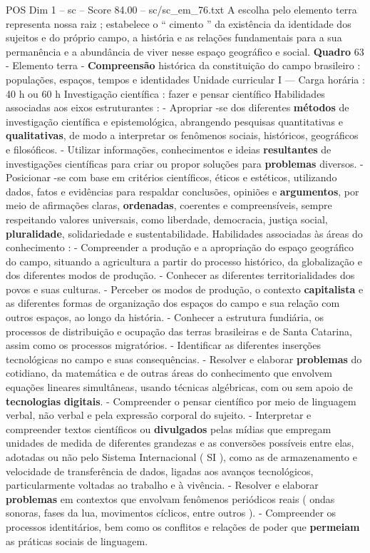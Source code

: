 \begin{textsample}{POS Dim 1 – sc – Score 84.00 – sc/sc\_em\_76.txt}
A escolha pelo elemento terra representa nossa raiz ; estabelece o “ cimento ” da existência da identidade dos sujeitos e do próprio campo, a história e as relações fundamentais para a sua permanência e a abundância de viver nesse espaço geográfico e social. \textbf{Quadro} 63 - Elemento terra - \textbf{Compreensão} histórica da constituição do campo brasileiro : populações, espaços, tempos e identidades Unidade curricular I — Carga horária : 40 h ou 60 h Investigação científica : fazer e pensar científico Habilidades associadas aos eixos estruturantes : - Apropriar -se dos diferentes \textbf{métodos} de investigação científica e epistemológica, abrangendo pesquisas quantitativas e \textbf{qualitativas}, de modo a interpretar os fenômenos sociais, históricos, geográficos e filosóficos. - Utilizar informações, conhecimentos e ideias \textbf{resultantes} de investigações científicas para criar ou propor soluções para \textbf{problemas} diversos. - Posicionar -se com base em critérios científicos, éticos e estéticos, utilizando dados, fatos e evidências para respaldar conclusões, opiniões e \textbf{argumentos}, por meio de afirmações claras, \textbf{ordenadas}, coerentes e compreensíveis, sempre respeitando valores universais, como liberdade, democracia, justiça social, \textbf{pluralidade}, solidariedade e sustentabilidade.
Habilidades associadas às áreas do conhecimento : - Compreender a produção e a apropriação do espaço geográfico do campo, situando a agricultura a partir do processo histórico, da globalização e dos diferentes modos de produção. - Conhecer as diferentes territorialidades dos povos e suas culturas. - Perceber os modos de produção, o contexto \textbf{capitalista} e as diferentes formas de organização dos espaços do campo e sua relação com outros espaços, ao longo da história. - Conhecer a estrutura fundiária, os processos de distribuição e ocupação das terras brasileiras e de Santa Catarina, assim como os processos migratórios. - Identificar as diferentes inserções tecnológicas no campo e suas consequências. - Resolver e elaborar \textbf{problemas} do cotidiano, da matemática e de outras áreas do conhecimento que envolvem equações lineares simultâneas, usando técnicas algébricas, com ou sem apoio de \textbf{tecnologias} \textbf{digitais}. - Compreender o pensar científico por meio de linguagem verbal, não verbal e pela expressão corporal do sujeito. - Interpretar e compreender textos científicos ou \textbf{divulgados} pelas mídias que empregam unidades de medida de diferentes grandezas e as conversões possíveis entre elas, adotadas ou não pelo Sistema Internacional ( SI ), como as de armazenamento e velocidade de transferência de dados, ligadas aos avanços tecnológicos, particularmente voltadas ao trabalho e à vivência. - Resolver e elaborar \textbf{problemas} em contextos que envolvam fenômenos periódicos reais ( ondas sonoras, fases da lua, movimentos cíclicos, entre outros ). - Compreender os processos identitários, bem como os conflitos e relações de poder que \textbf{permeiam} as práticas sociais de linguagem.

\end{textsample}
